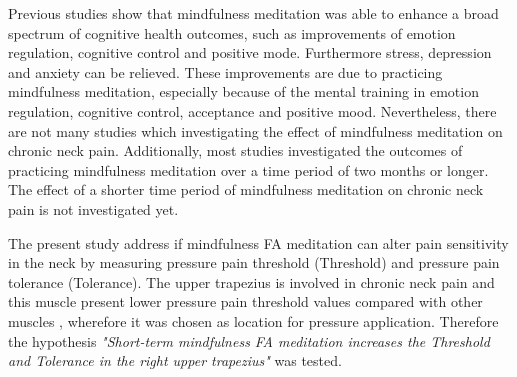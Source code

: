 Previous studies show that mindfulness meditation was able to enhance a broad spectrum of cognitive health outcomes, such as improvements of emotion regulation, cognitive control and positive mode. Furthermore stress, depression and anxiety can be relieved. These improvements are due to practicing mindfulness meditation, especially because of the mental training in emotion regulation, cognitive control, acceptance and positive mood. \cite{marcus2009,Zeidan2012, Zeidan2016} Nevertheless, there are not many studies which investigating the effect of mindfulness meditation on chronic neck pain. \cite{Macfarlanea2016} Additionally, most studies investigated the outcomes of practicing mindfulness meditation over a time period of two months or longer. The effect of a shorter time period of mindfulness meditation on chronic neck pain is not investigated yet. 


The present study address if mindfulness FA meditation can alter pain sensitivity in the neck by measuring pressure pain threshold (Threshold) and pressure pain tolerance (Tolerance). The upper trapezius is involved in chronic neck pain and this muscle present lower pressure pain threshold values compared with other muscles \cite{Fischer1987, Falla2004}, wherefore it was chosen as location for pressure application.
Therefore the hypothesis \textit{"Short-term mindfulness FA meditation increases the Threshold and Tolerance in the right upper trapezius"} was tested.

